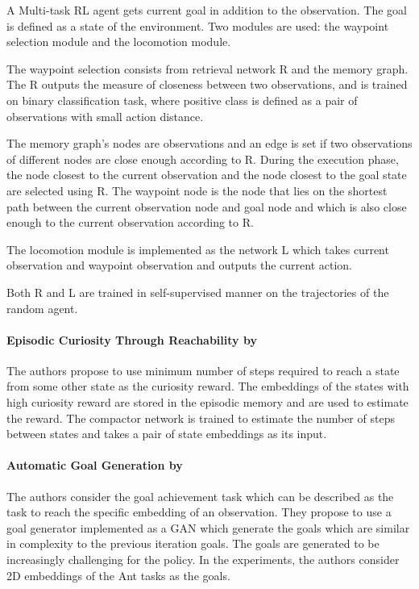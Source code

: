 \documentclass[acmsmall, nonacm]{acmart}
\begin{document}
A Multi-task RL agent gets current goal in addition to the observation. The goal is defined as a state of the environment. Two modules are used: the waypoint selection module and the locomotion module.

The waypoint selection consists from retrieval network R and the memory graph. The R outputs the measure of closeness between two observations, and is trained on binary classification task, where positive class is defined as a pair of observations with small action distance.

The memory graph's nodes are observations and an edge is set if two observations of different nodes are close enough according to R. During the execution phase, the node closest to the current observation and the node closest to the goal state are selected using R. The waypoint node is the node that lies on the shortest path between the current observation node and goal node and which is also close enough to the current observation according to R.

The locomotion module is implemented as the network L which takes current observation and waypoint observation and outputs the current action.

Both R and L are trained in self-supervised manner on the trajectories of the random agent.


\paragraph{Episodic Curiosity Through Reachability by \citet{savinov2018episodic}}

The authors propose to use minimum number of steps required to reach a state from some other state as the curiosity reward. The embeddings of the states with high curiosity reward are stored in the episodic memory and are used to estimate the reward. The compactor network is trained to estimate the number of steps between states and takes a pair of state embeddings as its input.


\paragraph{Automatic Goal Generation by \citet{pmlr-v80-florensa18a}}

The authors consider the goal achievement task which can be described as the task to reach the specific embedding of an observation. They propose to use a goal generator implemented as a GAN which generate the goals which are similar in complexity to the previous iteration goals. The goals are generated to be increasingly challenging for the policy. In the experiments, the authors consider 2D embeddings of the Ant tasks as the goals.
\end{document}
